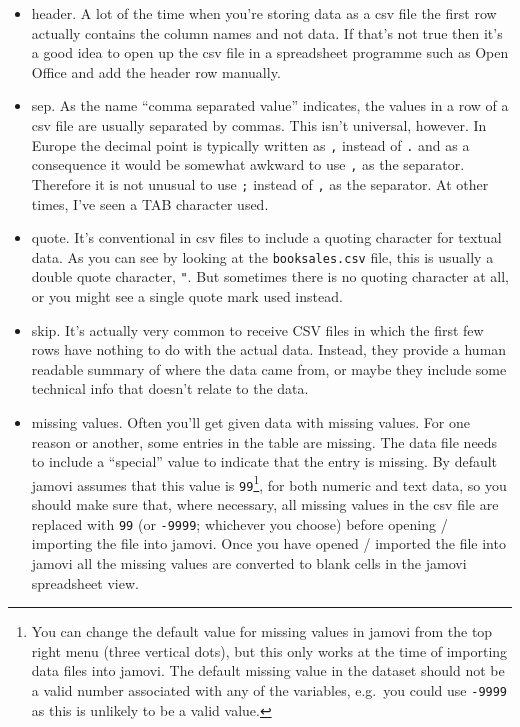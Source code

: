 \documentclass[
]{book}
\providecommand{\tightlist}{%
  \setlength{\itemsep}{0pt}\setlength{\parskip}{0pt}}
\begin{document}
\begin{itemize}
\tightlist
\item
  header. A lot of the time when you're storing data as a csv file the first row actually contains the column names and not data. If that's not true then it's a good idea to open up the csv file in a spreadsheet programme such as Open Office and add the header row manually.
\item
  sep. As the name ``comma separated value'' indicates, the values in a row of a csv file are usually separated by commas. This isn't universal, however. In Europe the decimal point is typically written as \texttt{,} instead of \texttt{.} and as a consequence it would be somewhat awkward to use \texttt{,} as the separator. Therefore it is not unusual to use \texttt{;} instead of \texttt{,} as the separator. At other times, I've seen a TAB character used.
\item
  quote. It's conventional in csv files to include a quoting character for textual data. As you can see by looking at the \texttt{booksales.csv} file, this is usually a double quote character, \texttt{"}. But sometimes there is no quoting character at all, or you might see a single quote mark \texttt{\textquotesingle{}} used instead.
\item
  skip. It's actually very common to receive CSV files in which the first few rows have nothing to do with the actual data. Instead, they provide a human readable summary of where the data came from, or maybe they include some technical info that doesn't relate to the data.
\item
  missing values. Often you'll get given data with missing values. For one reason or another, some entries in the table are missing. The data file needs to include a ``special'' value to indicate that the entry is missing. By default jamovi assumes that this value is \texttt{99}\footnote{You can change the default value for missing values in jamovi from the top right menu (three vertical dots), but this only works at the time of importing data files into jamovi. The default missing value in the dataset should not be a valid number associated with any of the variables, e.g.~you could use \texttt{-9999} as this is unlikely to be a valid value.}, for both numeric and text data, so you should make sure that, where necessary, all missing values in the csv file are replaced with \texttt{99} (or \texttt{-9999}; whichever you choose) before opening / importing the file into jamovi. Once you have opened / imported the file into jamovi all the missing values are converted to blank cells in the jamovi spreadsheet view.
\end{itemize}
\end{document}
